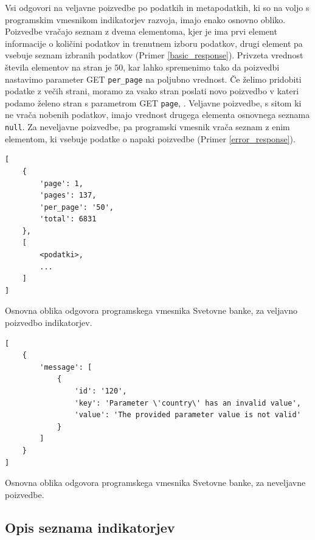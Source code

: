 Vsi odgovori na veljavne poizvedbe po podatkih in metapodatkih, ki so na voljo
s programskim vmesnikom indikatorjev razvoja, imajo enako osnovno obliko. 
Poizvedbe vračajo seznam z dvema elementoma, kjer je ima prvi element 
informacije o količini podatkov in trenutnem izboru podatkov, drugi element 
pa vsebuje seznam izbranih podatkov (Primer \ref{basic_response}). Privzeta
vrednost števila elementov na stran je $50$, kar lahko spremenimo tako da
poizvedbi nastavimo parameter GET \verb|per_page| na poljubno vrednost. Če
želimo pridobiti podatke z večih strani, moramo za vsako stran poslati novo
poizvedbo v kateri podamo želeno stran s parametrom GET \verb|page|, . 
Veljavne poizvedbe, s sitom ki ne vrača nobenih podatkov, imajo vrednost 
drugega elementa osnovnega seznama \verb|null|.
Za neveljavne poizvedbe, pa programski vmesnik vrača seznam z enim elementom,
ki vsebuje podatke o napaki poizvedbe (Primer \ref{error_response}).


\begin{snippet}
\begin{center}
\begin{lstlisting}
[
    {
        'page': 1,
        'pages': 137,
        'per_page': '50',
        'total': 6831
    },
    [
        <podatki>,
        ...
    ]
]
\end{lstlisting}
\end{center}
\caption{Osnovna oblika odgovora programskega vmesnika Svetovne banke, za
veljavno poizvedbo indikatorjev.} 
\label{basic_response}
\end{snippet} 


\begin{snippet}
\begin{center}
\begin{lstlisting}
[
    {
        'message': [
            {
                'id': '120',
                'key': 'Parameter \'country\' has an invalid value',
                'value': 'The provided parameter value is not valid'
            }
        ]
    }
]
\end{lstlisting}
\end{center}
\caption{Osnovna oblika odgovora programskega vmesnika Svetovne banke, za
neveljavne poizvedbe.}
\label{error_response}
\end{snippet} 


\subsection{Opis seznama indikatorjev}

